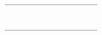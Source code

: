 \begin{footnotesize}
\begin{longtable}{|l|l|l|l|l|l|l|l|l|l|}
                              &                                                                            &               &                   &                     &                       &                     &                   &              &                            \\ \hline
                              &                                                                            &               &                   &                     &                       &                     &                   &              &                            \\ \hline
                              &                                                                            &               &                   &                     &                       &                     &                   &              &                            \\ \hline
                              &                                                                            &               &                   &                     &                       &                     &                   &              &                            \\ \hline
                              &                                                                            &               &                   &                     &                       &                     &                   &              &                            \\ \hline
                              &                                                                            &               &                   &                     &                       &                     &                   &              &                            \\ \hline
                              &                                                                            &               &                   &                     &                       &                     &                   &              &                            \\ \hline
                              &                                                                            &               &                   &                     &                       &                     &                   &              &                            \\ \hline

\end{longtable}
\end{footnotesize}
